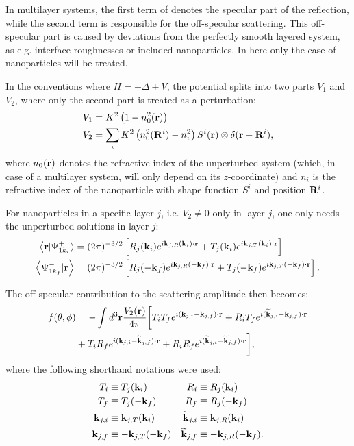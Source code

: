 In multilayer systems, the first term of  denotes the specular part of the reflection, while the second term is responsible for the off-specular scattering. This off-specular part is caused by deviations from the perfectly smooth layered system, as e.g. interface roughnesses or included nanoparticles. In here only the case of nanoparticles will be treated.

In the conventions where $H=-\Delta + V$, the potential splits into two parts $V_1$ and $V_2$, where only the second part is treated as a perturbation:
\begin{align*}
  V_1 & = K^2\left( 1-n_0^2(\mathbf{r})\right)  \\
  V_2 & = \sum_i K^2\left( n_0^2(\mathbf{R}^i) - n_i^2 \right) S^i(\mathbf{r}) \otimes \delta(\mathbf{r}-\mathbf{R}^i),
\end{align*}
where $n_0(\mathbf{r})$ denotes the refractive index of the unperturbed system (which, in case of a multilayer system, will only depend on its $z$-coordinate) and $n_i$ is the refractive index of the nanoparticle with shape function $S^i$ and position $\mathbf{R}^i$.

For nanoparticles in a specific layer $j$, i.e. $V_2\neq0$ only in layer $j$, one only needs the unperturbed solutions in layer $j$:
\begin{align*}
  \left\langle \mathbf{r} \vert \Psi^+_{1k_i} \right\rangle &= (2\pi)^{-3/2}\left[ R_j(\mathbf{k}_i) e^{i \mathbf{k}_{j,R}(\mathbf{k}_i)\cdot\mathbf{r}} + T_j(\mathbf{k}_i) e^{i \mathbf{k}_{j,T}(\mathbf{k}_i)\cdot\mathbf{r}} \right] \\
  \left\langle \Psi^-_{1k_f} \vert \mathbf{r} \right\rangle &= (2\pi)^{-3/2}\left[ R_j(-\mathbf{k}_f) e^{i \mathbf{k}_{j,R}(-\mathbf{k}_f)\cdot\mathbf{r}} + T_j(-\mathbf{k}_f) e^{i \mathbf{k}_{j,T}(-\mathbf{k}_f)\cdot\mathbf{r}} \right].
\end{align*}

The off-specular contribution to the scattering amplitude then becomes:
\begin{align*}
  f(\theta, \phi) &= -\int d^3\mathbf{r} \frac{V_2(\mathbf{r})}{4\pi} \biggl[ T_iT_fe^{i(\mathbf{k}_{j,i}-\mathbf{k}_{j,f})\cdot\mathbf{r}} + R_iT_fe^{i(\mathbf{\widetilde{k}}_{j,i}-\mathbf{k}_{j,f})\cdot\mathbf{r}} \\
   & + T_iR_fe^{i(\mathbf{k}_{j,i}-\mathbf{\widetilde{k}}_{j,f})\cdot\mathbf{r}} + R_iR_fe^{i(\mathbf{\widetilde{k}}_{j,i}-\mathbf{\widetilde{k}}_{j,f})\cdot\mathbf{r}} \biggr],
\end{align*}
where the following shorthand notations were used:
\begin{align*}
  T_i &\equiv  T_j(\mathbf{k}_i) & R_i &\equiv  R_j(\mathbf{k}_i)  \\
  T_f &\equiv  T_j(-\mathbf{k}_f) & R_f &\equiv  R_j(-\mathbf{k}_f) \\
  \mathbf{k}_{j,i} &\equiv \mathbf{k}_{j,T}(\mathbf{k}_i) & \mathbf{\widetilde{k}}_{j,i} &\equiv \mathbf{k}_{j,R}(\mathbf{k}_i)  \\
  \mathbf{k}_{j,f} &\equiv -\mathbf{k}_{j,T}(-\mathbf{k}_f) & \mathbf{\widetilde{k}}_{j,f} &\equiv -\mathbf{k}_{j,R}(-\mathbf{k}_f).
\end{align*}

